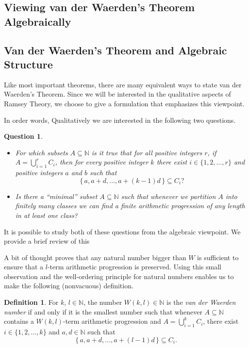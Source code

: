 \documentclass[12pt]{article}
\theoremstyle{plain}
\newtheorem*{ques}{Question}
\theoremstyle{definition}
\newtheorem*{defn}{Definition}
\newcommand{\bbN}{\mathbb{N}}
\begin{document}
\subsection{Viewing van der Waerden's Theorem Algebraically}
\subsection{Van der Waerden's Theorem and Algebraic Structure}
Like most important theorems, there are many equivalent ways to state
van der Waerden's Theorem.
Since we will be interested in the qualitative aspects of Ramsey
Theory, we choose to give a formulation that emphasizes this viewpoint.


In order words, 
Qualitatively we are interested in the following two questions.
  \begin{ques}
    \vspace*{1em}
    \begin{itemize}
      \item[(1)] For which subsets $A \subseteq \bbN$ is it true that
        for all positive integers $r$, if $A = \bigcup_{i=1}^r C_i$,
        then for every positive integer $k$ there exist $i \in \{1, 2,
        \ldots, r \}$ and positive integers $a$ and $b$ such that 
          \[
            \{\, a, a+d, \ldots, a+(k-1)d \,\} \subseteq C_i?
          \]
       \item[(2)] Is there a ``minimal'' subset $A \subseteq \bbN$
         such that whenever we partition $A$ into finitely many
         classes we can find a finite arithmetic progression of any
         length in at least one class?
    \end{itemize}
  \end{ques}

It is possible to study both of these questions from the algebraic
viewpoint. 
We provide a brief review of this 


A bit of thought proves that any
natural number bigger than $W$ is sufficient to ensure that a
$l$-term arithmetic progression is preserved.
Using this small observation and the well-ordering principle for
natural numbers enables us to make the following (nonvacuous) definition.

  \begin{defn}
    For $k$, $l \in \bbN$, the number $W(k,l) \in \bbN$ is the
    \textsl{van der Waerden number} if and only if it is the smallest
    number such that whenever $A \subseteq \bbN$ contains a $W(k,l)$-term
    arithmetic progression and $A = \bigcup_{i=1}^k C_i$, there exist
    $i \in \{1, 2, \ldots, k\}$ and $a, d \in \bbN$ such that
      \[
        \{\, a, a+d, \ldots, a+(l-1)d \,\} \subseteq C_i.
      \]
  \end{defn}
\end{document}

